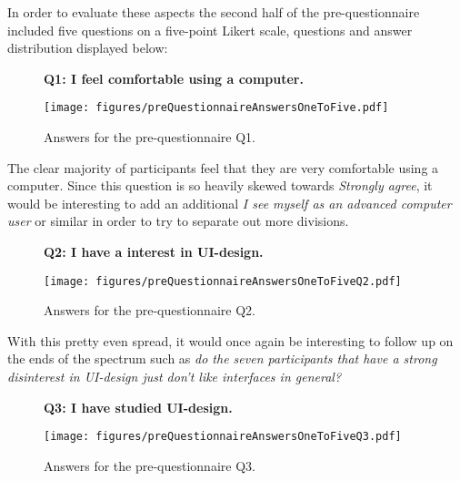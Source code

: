     In order to evaluate these aspects the second half of the
    pre-questionnaire included five questions on a five-point Likert scale,
    questions and answer distribution displayed below:

    \begin{figure}[h!]
      \textbf{Q1: I feel comfortable using a computer.}
      \begin{center}
        \texttt{[image: figures/preQuestionnaireAnswersOneToFive.pdf]}
        \caption{Answers for the pre-questionnaire Q1.}
      \end{center}
    \end{figure}

    The clear majority of participants feel that they are very comfortable
    using a computer. Since this question is so heavily skewed towards
    \textit{Strongly agree}, it would be interesting to add an additional
    \textit{I see myself as an advanced computer user} or similar in order
    to try to separate out more divisions.

    \begin{figure}[h!]
      \textbf{Q2: I have a interest in UI-design.}
      \begin{center}
        \texttt{[image: figures/preQuestionnaireAnswersOneToFiveQ2.pdf]}
        \caption{Answers for the pre-questionnaire Q2.}
      \end{center}
    \end{figure}

    With this pretty even spread, it would once again be interesting to follow
    up on the ends of the spectrum such as \textit{do the seven participants that
    have a strong disinterest in UI-design just don't like interfaces in
    general?}
%

    \begin{figure}[h!]
      \textbf{Q3: I have studied UI-design.}
      \begin{center}
        \texttt{[image: figures/preQuestionnaireAnswersOneToFiveQ3.pdf]}
        \caption{Answers for the pre-questionnaire Q3.}
      \end{center}
    \end{figure}

